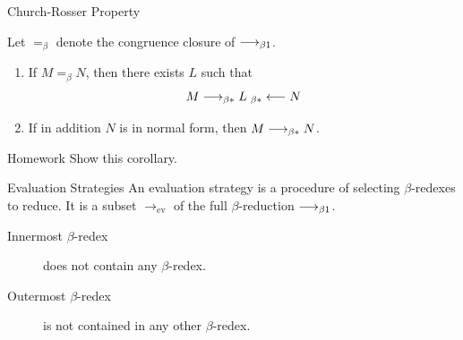 \begin{frame}[allowframebreaks]{Church-Rosser Property}
\begin{corollary}
  Let $=_\beta$ denote the congruence closure of $\longrightarrow_{\beta1}$. 
  \begin{enumerate}
    \item If $M =_\beta N$, then there exists $L$ such that 
      \[
        M \longrightarrow_{\beta*} L
        \; _{\beta*}\longleftarrow N
      \]
    \item If in addition $N$ is in normal form, then 
      $M \longrightarrow_{\beta*} N$. 
  \end{enumerate}
\end{corollary}
\begin{block}{Homework}
  Show this corollary.
\end{block}
\end{frame}

\begin{frame}[allowframebreaks]{Evaluation Strategies}
An evaluation strategy is a procedure of selecting $\beta$-redexes
to reduce. It is a subset $\longrightarrow_{\mathrm{ev}}$ of the full
$\beta$-reduction $\longrightarrow_{\beta1}$.

\begin{description}
  \item[Innermost $\beta$-redex] does not contain any $\beta$-redex.
  \item[Outermost $\beta$-redex] is not contained in any other $\beta$-redex.
\end{description}


\end{frame}
